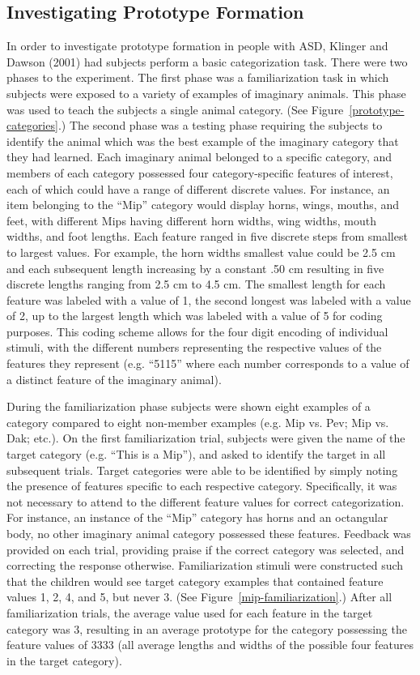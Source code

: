 \documentclass[man]{apa}
\begin{document}
\subsection{Investigating Prototype Formation}
In order to investigate prototype formation in people with ASD,  Klinger and Dawson (2001) had subjects perform a basic categorization task.  There were two phases to the experiment.  The first phase was a familiarization task in which subjects were exposed to a variety of examples of imaginary animals.  This phase was used to teach the subjects a single animal category. (See Figure~\ref{prototype-categories}.) The second phase was a testing phase requiring the subjects to identify the animal which was the best example of the imaginary category that they had learned.   Each imaginary animal belonged to a specific category, and members of each category possessed four category-specific features of interest, each of which could have a range of different discrete values.  For instance, an item belonging to the ``Mip'' category would display horns, wings, mouths, and feet, with different Mips having different horn widths, wing widths, mouth widths, and foot lengths.  Each feature ranged in five discrete steps from smallest to largest values.  For example, the horn widths smallest value could be 2.5 cm and each subsequent length increasing by a constant .50 cm resulting in five discrete lengths ranging from 2.5 cm to 4.5 cm.  The smallest length for each feature was labeled with a value of 1, the second longest was labeled with a value of 2, up to the largest length which was labeled with a value of 5 for coding purposes.  This coding scheme allows for the four digit encoding of individual stimuli, with the different numbers representing the respective values of the features they represent (e.g. ``5115'' where each number corresponds to a value of a distinct feature of the imaginary animal). 

During the familiarization phase subjects were shown eight examples of a category compared to eight non-member examples (e.g. Mip vs. Pev;  Mip vs. Dak; etc.).  On the first familiarization trial, subjects were given the name of the target category (e.g. ``This is a Mip''), and asked to identify the target in all subsequent trials.  Target categories were able to be identified by simply noting the presence of features specific to each respective category.  Specifically, it was not necessary to attend to the different feature values for correct categorization.  For instance, an instance of the ``Mip'' category has horns and an octangular body, no other imaginary animal category possessed these features.  Feedback was provided on each trial, providing praise if the correct category was selected, and correcting the response otherwise.  Familiarization stimuli were constructed such that the children would see target category examples that contained feature values 1, 2, 4, and 5, but never 3. (See Figure~\ref{mip-familiarization}.)  After all familiarization trials, the average value used for each feature in the target category was 3, resulting in an average prototype for the category possessing the feature values of 3333 (all average lengths and widths of the possible four features in the target category).  
\end{document}
